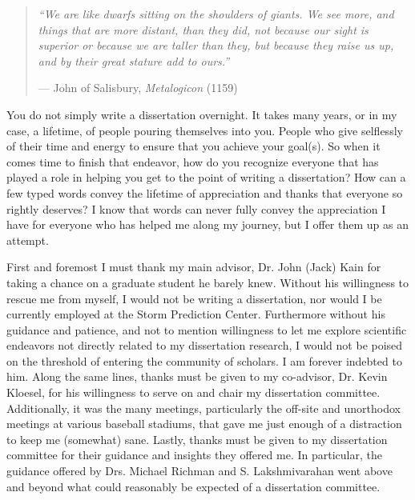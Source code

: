 

\begin{quotation}
    \textit{
        ``We are like dwarfs sitting on the shoulders of giants.
        We see more, and things that are more distant, than they did, not because our sight is superior or because we are taller than they, but because they raise us up, and by their great stature add to ours.''
    }
    \begin{flushright}
        --- John of Salisbury, \emph{Metalogicon} (1159)
    \end{flushright}
\end{quotation}


You do not simply write a dissertation overnight.
It takes many years, or in my case, a lifetime, of people pouring themselves into you.
People who give selflessly of their time and energy to ensure that you achieve your goal(s).
So when it comes time to finish that endeavor, how do you recognize everyone that has played a role in helping you get to the point of writing a dissertation?
How can a few typed words convey the lifetime of appreciation and thanks that everyone so rightly deserves?
I know that words can never fully convey the appreciation I have for everyone who has helped me along my journey, but I offer them up as an attempt.


First and foremost I must thank my main advisor, Dr. John (Jack) Kain for taking a chance on a graduate student he barely knew.
Without his willingness to rescue me from myself, I would not be writing a dissertation, nor would I be currently employed at the Storm Prediction Center.
Furthermore without his guidance and patience, and not to mention willingness to let me explore scientific endeavors not directly related to my dissertation research, I would not be poised on the threshold of entering the community of scholars.
I am forever indebted to him.
Along the same lines, thanks must be given to my co-advisor, Dr. Kevin Kloesel, for his willingness to serve on and chair my dissertation committee.
Additionally, it was the many meetings, particularly the off-site and unorthodox meetings at various baseball stadiums, that gave me just enough of a distraction to keep me (somewhat) sane.
Lastly, thanks must be given to my dissertation committee for their guidance and insights they offered me.
In particular, the guidance offered by Drs. Michael Richman and S. Lakshmivarahan went above and beyond what could reasonably be expected of a dissertation committee.


